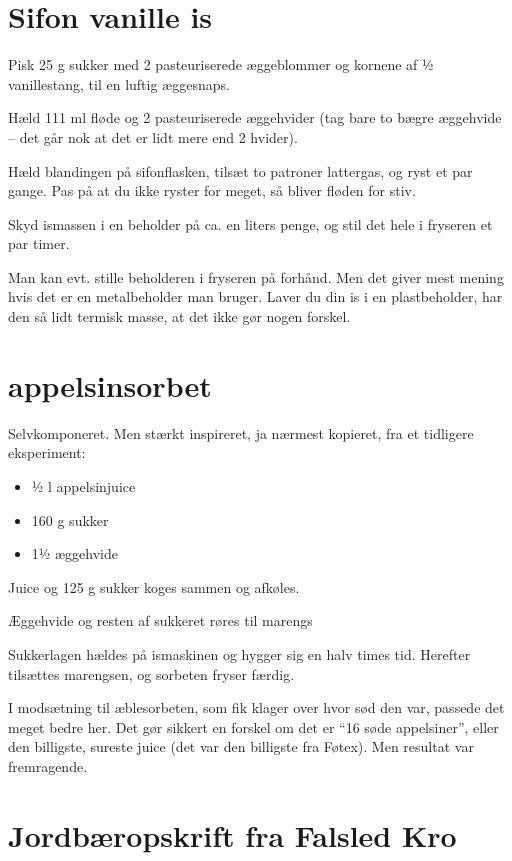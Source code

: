 \documentclass[
  letterpaper,
  DIV=11,
  numbers=noendperiod]{scrreprt}
\providecommand{\tightlist}{%
  \setlength{\itemsep}{0pt}\setlength{\parskip}{0pt}}\usepackage{longtable,booktabs,array}
\begin{document}
\hypertarget{sifon-vanille-is}{%
\section{Sifon vanille is}\label{sifon-vanille-is}}

Pisk 25 g sukker med 2 pasteuriserede æggeblommer og kornene af ½
vanillestang, til en luftig æggesnaps.

Hæld 111 ml fløde og 2 pasteuriserede æggehvider (tag bare to bægre
æggehvide -- det går nok at det er lidt mere end 2 hvider).

Hæld blandingen på sifonflasken, tilsæt to patroner lattergas, og ryst
et par gange. Pas på at du ikke ryster for meget, så bliver fløden for
stiv.

Skyd ismassen i en beholder på ca. en liters penge, og stil det hele i
fryseren et par timer.

Man kan evt. stille beholderen i fryseren på forhånd. Men det giver mest
mening hvis det er en metalbeholder man bruger. Laver du din is i en
plastbeholder, har den så lidt termisk masse, at det ikke gør nogen
forskel.

\hypertarget{appelsinsorbet}{%
\section{appelsinsorbet}\label{appelsinsorbet}}

Selvkomponeret. Men stærkt inspireret, ja nærmest kopieret, fra et
tidligere eksperiment:

\begin{itemize}
\tightlist
\item
  ½ l appelsinjuice
\item
  160 g sukker
\item
  1½ æggehvide
\end{itemize}

Juice og 125 g sukker koges sammen og afkøles.~

Æggehvide og resten af sukkeret røres til marengs

Sukkerlagen hældes på ismaskinen og hygger sig en halv times tid.
Herefter tilsættes marengsen, og sorbeten fryser færdig.

I modsætning til æblesorbeten, som fik klager over hvor sød den var,
passede det meget bedre her. Det gør sikkert en forskel om det er ``16
søde appelsiner'', eller den billigste, sureste juice (det var den
billigste fra Føtex). Men resultat var fremragende.

\hypertarget{jordbuxe6ropskrift-fra-falsled-kro}{%
\section{Jordbæropskrift fra Falsled
Kro}\label{jordbuxe6ropskrift-fra-falsled-kro}}
\end{document}
